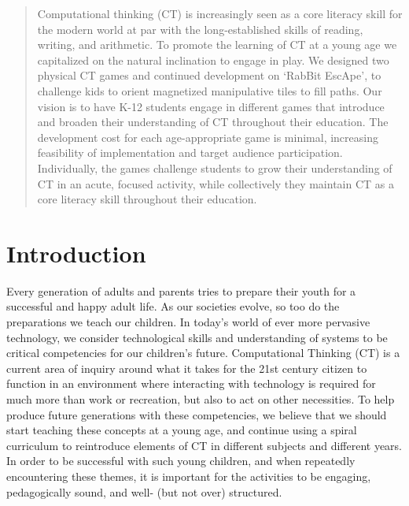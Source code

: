 \documentclass{acm_proc_article-sp}
\begin{document}
\date{12 January 2014}

\maketitle
\begin{abstract}
Computational thinking (CT) is increasingly seen as a core literacy skill for the modern world at par with the long-established skills of reading, writing, and arithmetic. 
To promote the learning of CT at a young age we capitalized on the natural inclination to engage in play. 
We designed two physical CT games and continued development on `RabBit EscApe', to challenge kids to orient magnetized  manipulative tiles to fill paths. 
Our vision is to have K-12 students engage in different games that introduce and broaden their understanding of CT throughout their education. 
The development cost for each age-appropriate game is minimal, increasing feasibility of implementation and target audience participation. 
Individually, the games challenge students to grow their understanding of CT in an acute, focused activity, while collectively they maintain CT as a core literacy skill throughout their education.
\end{abstract}




\section{Introduction}
\label{sec:intro}
Every generation of adults and parents tries to prepare their youth for a successful and happy adult life. 
As our societies evolve, so too do the preparations we teach our children. 
In today's world of ever more pervasive technology, we consider technological skills and understanding of systems to be critical competencies for our children's future.
Computational Thinking (CT) is a current area of inquiry around what it takes for the 21st century citizen to function in an environment where interacting with technology is required for much more than work or recreation, but also to act on other necessities.
To help produce future generations with these competencies, we believe that we should start teaching these concepts at a young age, and continue using a spiral curriculum \cite{bruner1963process,bruner1966towards} to reintroduce elements of CT in different subjects and different years.
In order to be successful with such young children, and when repeatedly encountering these themes, it is important for the activities to be engaging, pedagogically sound, and well- (but not over) structured.
\end{document}
